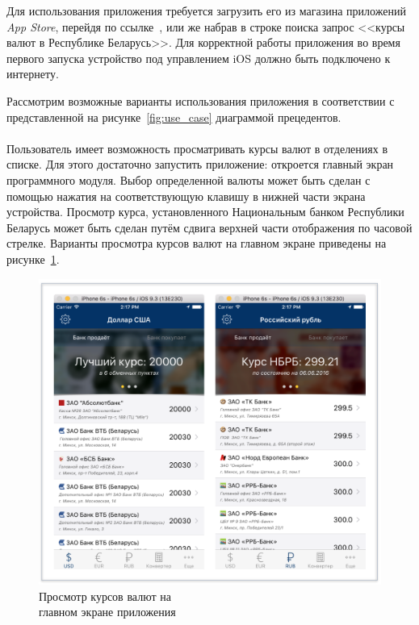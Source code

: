 Для использования приложения требуется загрузить его из магазина
приложений \textit{App Store}, перейдя по ссылке~\cite{itunes_app_link},
или же набрав в строке поиска запрос <<курсы валют в Республике Беларусь>>.
Для корректной работы приложения во время первого запуска устройство
под управлением iOS должно быть подключено к интернету.

Рассмотрим возможные варианты использования приложения в соответствии с
представленной на рисунке~\ref{fig:use_case} диаграммой прецедентов.



\paragraph{}
Пользователь имеет возможность просматривать курсы валют в отделениях в списке.
Для этого достаточно запустить приложение: откроется главный экран программного модуля.
Выбор определенной валюты может быть сделан с помощью нажатия на соответствующую
клавишу в нижней части экрана устройства. Просмотр курса, установленного
Национальным банком Республики Беларусь может быть сделан путём сдвига
верхней части отображения по часовой стрелке.
Варианты просмотра курсов валют на главном экране приведены на
рисунке~\ref{fig:main_screen_manual}.
\begin{figure}[h!]
  \centering
  \includegraphics[width=120mm]{fig/main_screen_manual}
  \caption{Просмотр курсов валют на \\ главном экране приложения}
  \label{fig:main_screen_manual}
\end{figure}



